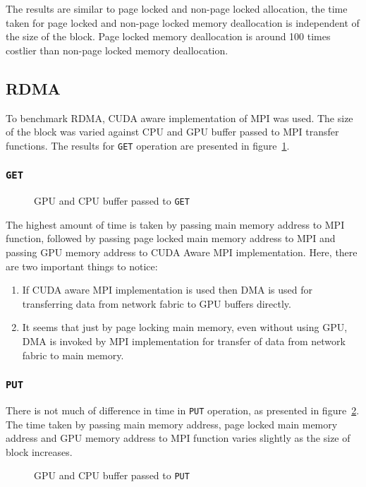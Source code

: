 The results are similar to page locked and non-page locked allocation, the time
taken for page locked and non-page locked memory deallocation is independent of
the size of the block. Page locked memory deallocation is around 100 times costlier
than non-page locked memory deallocation.

\subsection{RDMA}
To benchmark RDMA, CUDA aware implementation of MPI was used. The size of the block
was varied against CPU and GPU buffer passed to MPI transfer functions. The results
for \texttt{GET} operation are presented in figure~\ref{fig:mempin_rdma_get}.

\subsubsection{\texttt{GET}}
\begin{figure}[h]
  
  \caption{GPU and CPU buffer passed to \texttt{GET}}
  \label{fig:mempin_rdma_get}
\end{figure}


The highest amount of time is taken by passing main memory address to MPI function,
followed by passing page locked main memory address to MPI and passing GPU memory
address to CUDA Aware MPI implementation. Here, there are two important things to
notice:
\begin{enumerate}
\item If CUDA aware MPI implementation is used then DMA is used for transferring
  data from network fabric to GPU buffers directly.
\item It seems that just by page locking main memory, even without using GPU, DMA
  is invoked by MPI implementation for transfer of data from network fabric to
  main memory.
\end{enumerate}

\subsubsection{\texttt{PUT}}
There is not much of difference in time in \texttt{PUT} operation, as presented
in figure~\ref{fig:mempin_rdma_put}. The time taken by passing main memory address,
page locked main memory address and GPU memory address to MPI function varies slightly
as the size of block increases.

\begin{figure}[h]
  
  \caption{GPU and CPU buffer passed to \texttt{PUT}}
  \label{fig:mempin_rdma_put}
\end{figure}

